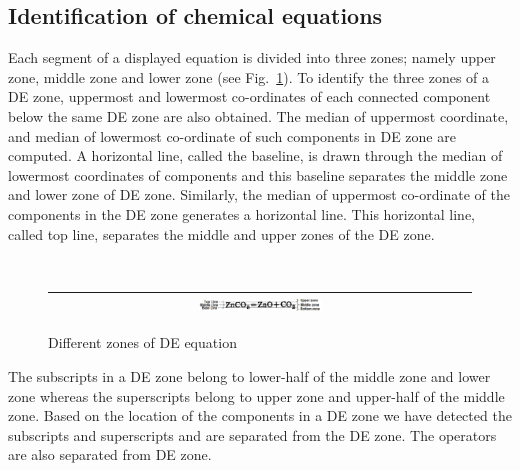 \subsection{Identification of chemical equations} Each segment
of a displayed equation is divided into three zones; namely
upper zone, middle zone and lower zone (see
Fig.~\ref{sub_super}). To identify the three zones of a DE zone,
uppermost and lowermost co-ordinates of each connected component
below the same DE zone are also obtained. The median of
uppermost coordinate, and median of lowermost co-ordinate of
such components in DE zone are computed. A horizontal line,
called the baseline, is drawn through the median of lowermost
coordinates of components and this baseline separates the middle
zone and lower zone of DE zone. Similarly, the median of
uppermost co-ordinate of the components in the DE zone generates
a horizontal line. This horizontal line, called top line,
separates the middle and upper zones of the DE zone.

\begin{figure}[h]
\center\ 
\begin{tabular}{|c|} 
\hline
\includegraphics[width=0.3\textwidth]{supSub.png}\\
\hline
\end{tabular} 
\caption{Different zones of DE equation}
\label{sub_super} 
\end{figure} 
The subscripts in a DE zone
belong to lower-half of the middle zone and lower zone whereas
the superscripts belong to upper zone and upper-half of the
middle zone. Based on the location of the components in a DE
zone we have detected the subscripts and superscripts and are
separated from the DE zone. The operators are also separated
from DE zone.
 

